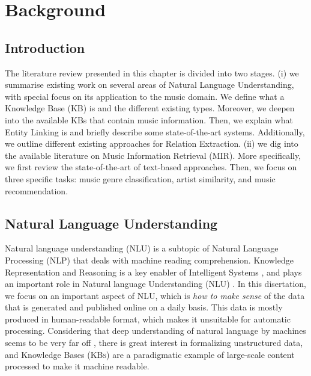 
\chapter{Background}
\label{sec:SOA}

\section{Introduction}
\label{sec:SOA:Introduction}

The literature review presented in this chapter is divided into two stages.
(i) we summarise existing work on several areas of Natural Language Understanding, with special focus on its application to the music domain. 
We define what a Knowledge Base (KB) is and the different existing types. Moreover, we deepen into the available KBs that contain music information.
Then, we explain what Entity Linking is and briefly describe some state-of-the-art systems. Additionally, we outline different existing approaches for Relation Extraction. 
(ii) we dig into the available literature on Music Information Retrieval (MIR). More specifically, we first review the state-of-the-art of text-based approaches. Then, we focus on three specific tasks: music genre classification, artist similarity, and music recommendation.


\section{Natural Language Understanding}
\label{sec:SOA:nlu}

Natural language understanding (NLU) is a subtopic of Natural Language Processing (NLP) that deals with machine reading comprehension.
Knowledge Representation and Reasoning is a key enabler of Intelligent Systems \cite{Suchaneketal2007}, and plays an important role in Natural language Understanding (NLU) \cite{BaralandDeGiacomo2015}.
In this disertation, we focus on an important aspect of NLU, which is \textit{how to make sense} of the data that is generated and published online on a daily basis. This data is mostly produced in human-readable format, which makes it unsuitable for automatic processing. Considering that deep understanding of natural language by machines seems to be very far off \cite{CambriaandWhite2014}, there is great interest in formalizing unstructured data, and Knowledge Bases (\textsc{KBs}) are a paradigmatic example of large-scale content processed to make it machine readable.

